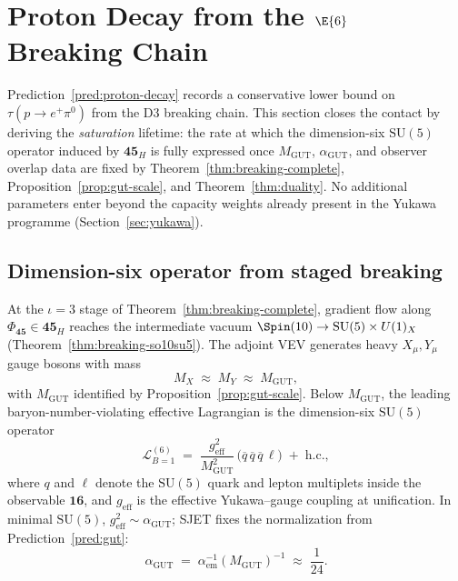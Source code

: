 \section{Proton Decay from the $\E{6}$ Breaking Chain}
\label{sec:proton-decay}

Prediction~\ref{pred:proton-decay} records a conservative lower bound on
$\tau(p\to e^+\pi^0)$ from the D3 breaking chain. This section closes the
contact by deriving the \emph{saturation} lifetime: the rate at which the
dimension-six $\mathrm{SU}(5)$ operator induced by $\mathbf{45}_H$ is fully
expressed once $M_{\mathrm{GUT}}$, $\alpha_{\mathrm{GUT}}$, and observer
overlap data are fixed by Theorem~\ref{thm:breaking-complete},
Proposition~\ref{prop:gut-scale}, and Theorem~\ref{thm:duality}. No
additional parameters enter beyond the capacity weights already present in
the Yukawa programme (Section~\ref{sec:yukawa}).

\subsection{Dimension-six operator from staged breaking}
\label{sec:proton-decay:operator}

At the $\iota=3$ stage of Theorem~\ref{thm:breaking-complete}, gradient flow
along $\Phi_{\mathbf{45}}\in\mathbf{45}_H$ reaches the intermediate vacuum
$\Spin(10)\to\mathrm{SU}(5)\times U(1)_X$
(Theorem~\ref{thm:breaking-so10su5}). The adjoint VEV generates heavy
$X_\mu,Y_\mu$ gauge bosons with mass
\begin{equation}\label{eq:proton-XY-mass}
  M_X \;\approx\; M_Y \;\approx\; M_{\mathrm{GUT}},
\end{equation}
with $M_{\mathrm{GUT}}$ identified by Proposition~\ref{prop:gut-scale}. Below
$M_{\mathrm{GUT}}$, the leading baryon-number-violating effective Lagrangian is
the dimension-six $\mathrm{SU}(5)$ operator
\begin{equation}\label{eq:proton-dim6}
  \mathcal{L}_{B=1}^{(6)}
  \;=\;
  \frac{g_{\mathrm{eff}}^{2}}{M_{\mathrm{GUT}}^{2}}\,
  \bigl(\overline{q}\,\overline{q}\,\overline{q}\,\ell\bigr)
  \;+\;\mathrm{h.c.},
\end{equation}
where $q$ and $\ell$ denote the $\mathrm{SU}(5)$ quark and lepton multiplets
inside the observable $\mathbf{16}$, and $g_{\mathrm{eff}}$ is the effective
Yukawa--gauge coupling at unification. In minimal $\mathrm{SU}(5)$,
$g_{\mathrm{eff}}^{2}\sim\alpha_{\mathrm{GUT}}$; SJET fixes the normalization
from Prediction~\ref{pred:gut}:
\begin{equation}\label{eq:alpha-gut}
  \alpha_{\mathrm{GUT}}
  \;=\;
  \alpha_{\mathrm{em}}^{-1}(M_{\mathrm{GUT}})^{-1}
  \;\approx\;
  \frac{1}{24}.
\end{equation}

